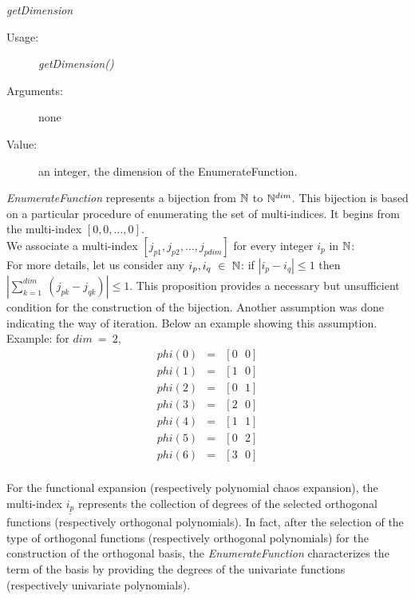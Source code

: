 \begin{description}
\begin{description}
\item \textit{getDimension}
\begin{description}
\item[Usage:] \textit{getDimension()}
\item[Arguments:] none
\item[Value:] an integer, the dimension of the EnumerateFunction.
\end{description}

\end{description}
\item[Details:] \textit{EnumerateFunction} represents a bijection from ${\mathbb N}$ to ${\mathbb N}^{dim}$. This bijection is based on a particular procedure of enumerating the set of multi-indices. It begins from the multi-index $[0,0,...,0]$. \\We associate a multi-index $[j_{p1}, j_{p2},..., j_{pdim}]$ for every integer $i_p$ in ${\mathbb N}$: \\ For more details, let us consider any $i_p, i_q~\in~{\mathbb N}$: if $|i_p-i_q|\leq 1$ then $|\sum_{k=1}^{dim}~(j_{pk}- j_{qk})| \leq 1$. This proposition provides a necessary but unsufficient condition for the construction of the bijection. Another assumption was done indicating the way of iteration. Below an example showing this assumption.\\
Example:
for $dim~=~2$,
\begin{eqnarray*}
phi(0) &=& [0~~~0] \\
phi(1) &=& [1~~~0] \\
phi(2) &=& [0~~~1] \\
phi(3) &=& [2~~~0] \\
phi(4) &=& [1~~~1] \\
phi(5) &=& [0~~~2] \\
phi(6) &=& [3~~~0] \\
\end{eqnarray*}
\end{description}

For the functional expansion (respectively polynomial chaos expansion), the multi-index $\underline{i_p}$ represents the collection of degrees of the selected orthogonal functions (respectively orthogonal polynomials). In fact, after the selection of the type of orthogonal functions (respectively orthogonal polynomials) for the construction of the orthogonal basis, the \textit{EnumerateFunction} characterizes the term of the basis by providing the degrees of the univariate functions (respectively univariate polynomials).


